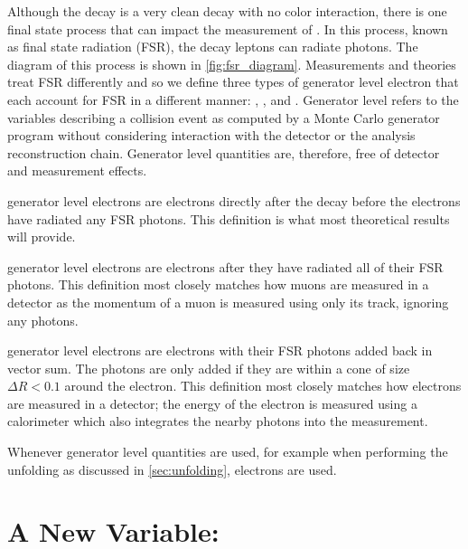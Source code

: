 Although the \Ztoee decay is a very clean decay with no color interaction,
there is one final state process that can impact the measurement of \Z
\bosonpt. In this process, known as final state radiation (FSR),  the decay
leptons can radiate photons.  The diagram of this process is shown in
\cref{fig:fsr_diagram}. Measurements and theories treat FSR differently and so
we define three types of generator level electron that each account for FSR in
a different manner: \born, \bare, and \dressed. Generator level refers to the
variables describing a collision event as computed by a Monte Carlo generator
program without considering interaction with the detector or the analysis
reconstruction chain. Generator level quantities are, therefore, free of
detector and measurement effects.

\Born generator level electrons are electrons directly after the \Ztoee decay
before the electrons have radiated any FSR photons. This definition is what
most theoretical results will provide.

\Bare generator level electrons are \born electrons after they have radiated all
of their FSR photons. This definition most closely matches how muons are
measured in a detector as the momentum of a muon is measured using only its
track, ignoring any photons.

\Dressed generator level electrons are \bare electrons with their FSR photons
added back in vector sum. The photons are only added if they are within a cone
of size $\Delta R < 0.1$ around the electron. This definition most closely
matches how electrons are measured in a detector; the energy of the electron is
measured using a calorimeter which also integrates the nearby photons into the
measurement.

Whenever generator level quantities are used, for example when performing the
unfolding as discussed in \cref{sec:unfolding}, \dressed electrons are
used.


\section{A New Variable: \texorpdfstring{\phistar}{Phistar}}

